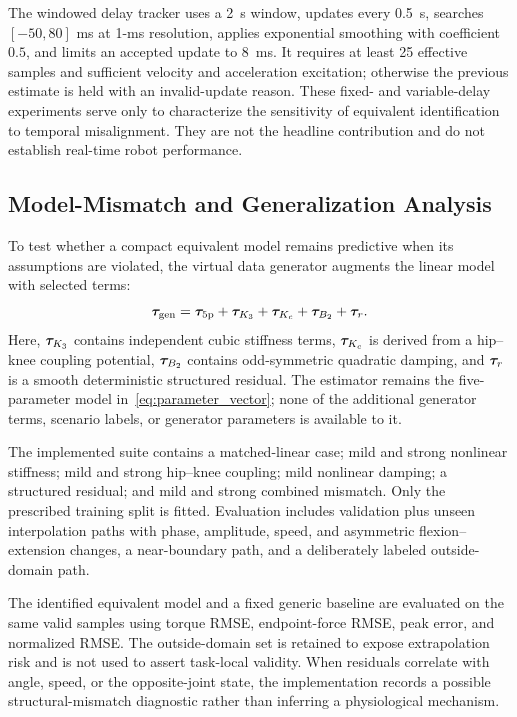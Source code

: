 The windowed delay tracker uses a \SI{2}{s} window, updates every
\SI{0.5}{s}, searches $[-50,80]$ ms at 1-ms resolution, applies exponential
smoothing with coefficient $0.5$, and limits an accepted update to
\SI{8}{ms}.  It requires at least 25 effective samples and sufficient velocity
and acceleration excitation; otherwise the previous estimate is held with an
invalid-update reason.  These fixed- and variable-delay experiments serve only
to characterize the sensitivity of equivalent identification to temporal
misalignment.  They are not the headline contribution and do not establish
real-time robot performance.

\subsection{Model-Mismatch and Generalization Analysis}
\label{subsec:model_mismatch}

To test whether a compact equivalent model remains predictive when its
assumptions are violated, the virtual data generator augments the linear model
with selected terms:
\begin{equation}
    \bm{\tau}_{\mathrm{gen}}
    =\bm{\tau}_{5\mathrm{p}}
    +\bm{\tau}_{K_3}
    +\bm{\tau}_{K_c}
    +\bm{\tau}_{B_2}
    +\bm{\tau}_{r}.
    \label{eq:mismatch_generator}
\end{equation}
Here, $\bm{\tau}_{K_3}$ contains independent cubic stiffness terms,
$\bm{\tau}_{K_c}$ is derived from a hip--knee coupling potential,
$\bm{\tau}_{B_2}$ contains odd-symmetric quadratic damping, and
$\bm{\tau}_{r}$ is a smooth deterministic structured residual.  The
estimator remains the five-parameter model in~\eqref{eq:parameter_vector}; none
of the additional generator terms, scenario labels, or generator parameters is
available to it.

The implemented suite contains a matched-linear case; mild and strong
nonlinear stiffness; mild and strong hip--knee coupling; mild nonlinear
damping; a structured residual; and mild and strong combined mismatch.  Only
the prescribed training split is fitted.  Evaluation includes validation plus
unseen interpolation paths with phase, amplitude, speed, and asymmetric
flexion--extension changes, a near-boundary path, and a deliberately labeled
outside-domain path.

The identified equivalent model and a fixed generic baseline are evaluated on
the same valid samples using torque RMSE, endpoint-force RMSE, peak error, and
normalized RMSE.  The outside-domain set is retained to expose extrapolation
risk and is not used to assert task-local validity.  When residuals correlate
with angle, speed, or the opposite-joint state, the implementation records a
possible structural-mismatch diagnostic rather than inferring a physiological
mechanism.

